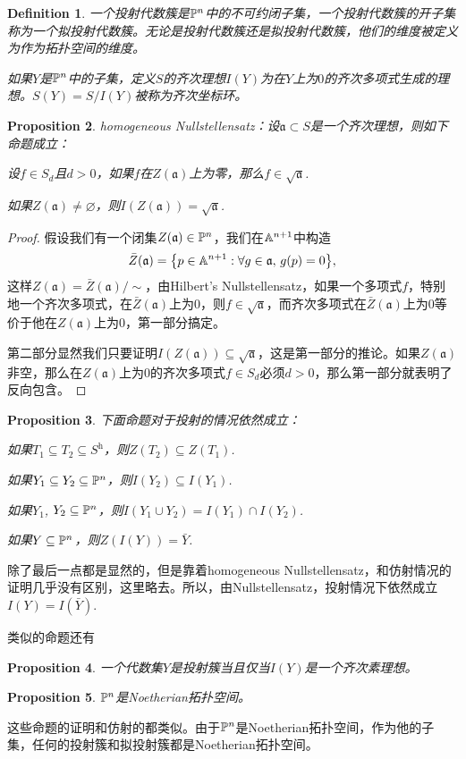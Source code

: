 \documentclass[9pt]{extarticle}
\theoremstyle{plain}%
\newtheorem{defi}{Definition}[section]%
\newtheorem{pro}[defi]{Proposition}%
\begin{document}
\begin{defi}
	一个投射代数簇是$\mathbb{P}^n$中的不可约闭子集，一个投射代数簇的开子集称为一个拟投射代数簇。无论是投射代数簇还是拟投射代数簇，他们的维度被定义为作为拓扑空间的维度。

	如果$Y$是$\mathbb{P}^n$中的子集，定义$S$的齐次理想$I(Y)$为在$Y$上为$0$的齐次多项式生成的理想。$S(Y)=S/I(Y)$被称为齐次坐标环。
\end{defi}

\begin{pro}
homogeneous Nullstellensatz：设$\mathfrak{a}\subset S$是一个齐次理想，则如下命题成立：

 设$f\in S_d$且$d>0$，如果$f$在$Z(\mathfrak{a})$上为零，那么$f \in \sqrt{\mathfrak{a}}$.

 如果$Z(\mathfrak{a})\neq \varnothing$，则$I(Z(\mathfrak{a}))=\sqrt{\mathfrak{a}}$.
\end{pro}
\begin{proof}
	假设我们有一个闭集$Z(\mathfrak{a})\in \mathbb{P}^n$，我们在$\mathbb{A}^{n+1}$中构造
	\[
		\bar{Z}(\mathfrak{a})=\bigl\{p\in \mathbb{A}^{n+1}:\forall g\in \mathfrak{a},\, g(p)=0\bigr\},
	\]
	这样$Z(\mathfrak{a})=\bar{Z}(\mathfrak{a})/\sim$，由Hilbert's Nullstellensatz，如果一个多项式$f$，特别地一个齐次多项式，在$\bar{Z}(\mathfrak{a})$上为$0$，则$f\in \sqrt{\mathfrak{a}}$，而齐次多项式在$\bar{Z}(\mathfrak{a})$上为$0$等价于他在$Z(\mathfrak{a})$上为$0$，第一部分搞定。

	第二部分显然我们只要证明$I(Z(\mathfrak{a}))\subseteq \sqrt{\mathfrak{a}}$，这是第一部分的推论。如果$Z(\mathfrak{a})$非空，那么在$Z(\mathfrak{a})$上为$0$的齐次多项式$f\in S_d$必须$d>0$，那么第一部分就表明了反向包含。
\end{proof}

\begin{pro}
	下面命题对于投射的情况依然成立：

	 如果$T_1\subseteq T_2 \subseteq S^{\mathrm{h}}$，则$Z(T_2)\subseteq Z(T_1)$.

	 如果$Y_1\subseteq Y_2 \subseteq \mathbb{P}^n$，则$I(Y_2)\subseteq I(Y_1)$.

	 如果$Y_1$, $Y_2 \subseteq \mathbb{P}^n$，则$I(Y_1\cup Y_2)=I(Y_1)\cap I(Y_2)$.

	 如果$Y \subseteq \mathbb{P}^n$，则$Z(I(Y))=\bar{Y}$.
\end{pro}
除了最后一点都是显然的，但是靠着homogeneous Nullstellensatz，和仿射情况的证明几乎没有区别，这里略去。所以，由Nullstellensatz，投射情况下依然成立$I(Y)=I(\bar{Y})$.

类似的命题还有
\begin{pro}
	一个代数集$Y$是投射簇当且仅当$I(Y)$是一个齐次素理想。
\end{pro}
\begin{pro}
	$\mathbb{P}^n$是Noetherian拓扑空间。
\end{pro}
这些命题的证明和仿射的都类似。由于$\mathbb{P}^n$是Noetherian拓扑空间，作为他的子集，任何的投射簇和拟投射簇都是Noetherian拓扑空间。
\end{document}

